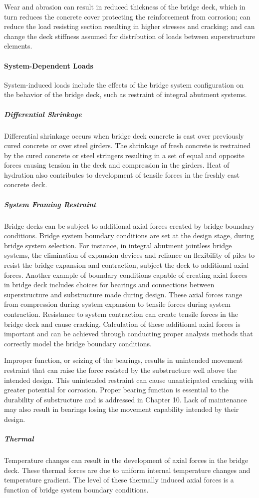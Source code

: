 Wear and abrasion can result in reduced thickness of the bridge deck, which in turn reduces the concrete cover protecting the reinforcement from corrosion; can reduce the load resisting section resulting in higher stresses and cracking; and can change the deck stiffness assumed for distribution of loads between superstructure elements.


\paragraph{System-Dependent Loads}
System-induced loads include the effects of the bridge system configuration on the behavior of the bridge deck, such as restraint of integral abutment systems.

\subparagraph*{Differential Shrinkage}
Differential shrinkage occurs when bridge deck concrete is cast over previously cured concrete or over steel girders. The shrinkage of fresh concrete is restrained by the cured concrete or steel stringers resulting in a set of equal and opposite forces causing tension in the deck and compression in the girders. Heat of hydration also contributes to development of tensile forces in the freshly cast concrete deck.
\subparagraph*{System Framing Restraint}
Bridge decks can be subject to additional axial forces created by bridge boundary conditions. Bridge system boundary conditions are set at the design stage, during bridge system selection. For instance, in integral abutment jointless bridge systems, the elimination of expansion devices and reliance on flexibility of piles to resist the bridge expansion and contraction, subject the deck to additional axial forces. Another example of boundary conditions capable of creating axial forces in bridge deck includes choices for bearings and connections between superstructure and substructure made during design. These axial forces range from compression during system expansion to tensile forces during system contraction. Resistance to system contraction can create tensile forces in the bridge deck and cause cracking. Calculation of these additional axial forces is important and can be achieved through conducting proper analysis methods that correctly model the bridge boundary conditions.

Improper function, or seizing of the bearings, results in unintended movement restraint that can raise the force resisted by the substructure well above the intended design. This unintended restraint can cause unanticipated cracking with greater potential for corrosion. Proper bearing function is essential to the durability of substructure and is addressed in Chapter 10. Lack of maintenance may also result in bearings losing the movement capability intended by their design.
\subparagraph*{Thermal}
Temperature changes can result in the development of axial forces in the bridge deck. These thermal forces are due to uniform internal temperature changes and temperature gradient. The level of these thermally induced axial forces is a function of bridge system boundary conditions.


